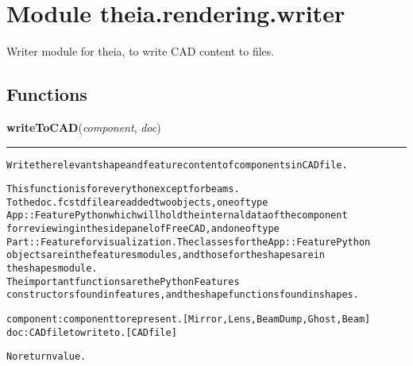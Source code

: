 %
%
%


\section{Module theia.rendering.writer}

    \label{theia:rendering:writer}
Writer module for theia, to write CAD content to files.



  \subsection{Functions}

    \label{theia:rendering:writer:writeToCAD}

    \vspace{0.5ex}

\hspace{.8\funcindent}\begin{boxedminipage}{\funcwidth}

    \raggedright \textbf{writeToCAD}(\textit{component}, \textit{doc})

    \vspace{-1.5ex}

    \rule{\textwidth}{0.5\fboxrule}
\setlength{\parskip}{2ex}
\begin{alltt}
Write the relevant shape and feature content of components in CAD file.

This function is for everython except for beams.
To the doc .fcstd file are added two objects, one of type
    App::FeaturePython which will hold the internal data of the component
    for reviewing in the side panel of FreeCAD, and one of type
    Part::Feature for visualization. The classes for the App::FeaturePython
    objects are i nthe features modules, and those for the shapes are in
    the shapes module.
The important functions are the PythonFeatures
    constructors found in features, and the shape functions found in shapes.

component: component to represent. [Mirror, Lens, BeamDump, Ghost, Beam]
doc: CAD file to write to. [CAD file]

No return value.
\end{alltt}

\setlength{\parskip}{1ex}
    \end{boxedminipage}

